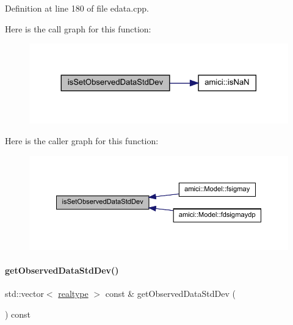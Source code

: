 Definition at line 180 of file edata.\+cpp.

Here is the call graph for this function\+:
\nopagebreak
\begin{figure}[H]
\begin{center}
\leavevmode
\includegraphics[width=324pt]{classamici_1_1_exp_data_a75808a32f77afa60bb736a1dfbce9aba_cgraph}
\end{center}
\end{figure}
Here is the caller graph for this function\+:
\nopagebreak
\begin{figure}[H]
\begin{center}
\leavevmode
\includegraphics[width=350pt]{classamici_1_1_exp_data_a75808a32f77afa60bb736a1dfbce9aba_icgraph}
\end{center}
\end{figure}
\mbox{\label{classamici_1_1_exp_data_ada8a2eebadd4eba1a7c3fa1a014a76d0}} 
\paragraph{\texorpdfstring{get\+Observed\+Data\+Std\+Dev()}{getObservedDataStdDev()}}
{\footnotesize\ttfamily std\+::vector$<$ \mbox{\hyperlink{namespaceamici_a1bdce28051d6a53868f7ccbf5f2c14a3}{realtype}} $>$ const  \& get\+Observed\+Data\+Std\+Dev (\begin{DoxyParamCaption}{ }\end{DoxyParamCaption}) const}

